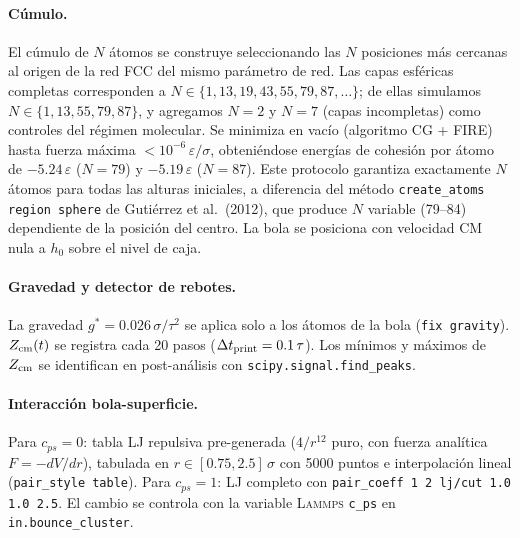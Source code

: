 \documentclass[aps,pre,twocolumn,reprint,superscriptaddress]{revtex4-2}
\newcommand{\eps}{\varepsilon}
\newcommand{\gstar}{g^*}
\newcommand{\lammps}{\textsc{Lammps}}
\begin{document}
\paragraph{Cúmulo.}
El cúmulo de $N$ átomos se construye seleccionando las $N$ posiciones más
cercanas al origen de la red FCC del mismo parámetro de red. Las capas
esféricas completas corresponden a $N\in\{1,13,19,43,55,79,87,\ldots\}$;
de ellas simulamos $N\in\{1,13,55,79,87\}$, y agregamos $N=2$ y $N=7$
(capas incompletas) como controles del régimen molecular.
Se minimiza en vacío (algoritmo CG + FIRE) hasta fuerza máxima
$<10^{-6}\,\eps/\sigma$, obteniéndose energías de cohesión por átomo de
$-5.24\,\eps$ ($N=79$) y $-5.19\,\eps$ ($N=87$). Este protocolo garantiza
exactamente $N$ átomos para todas las alturas iniciales, a diferencia del
método \texttt{create\_atoms region sphere} de Gutiérrez et al.\ (2012),
que produce $N$ variable (79--84) dependiente de la posición del centro.
La bola se posiciona con velocidad CM nula a $h_0$ sobre el nivel de caja.

\paragraph{Gravedad y detector de rebotes.}
La gravedad $\gstar=0.026\,\sigma/\tau^2$ se aplica solo a los átomos de la
bola (\texttt{fix gravity}). $Z_{\rm cm}(t)$ se registra cada 20 pasos
($\Delta t_{\rm print}=0.1\,\tau$). Los mínimos y máximos de $Z_{\rm cm}$
se identifican en post-análisis con \texttt{scipy.signal.find\_peaks}.

\paragraph{Interacción bola-superficie.}
Para $c_{ps}=0$: tabla LJ repulsiva pre-generada ($4/r^{12}$ puro, con
fuerza analítica $F=-dV/dr$), tabulada en $r\in[0.75,2.5]\,\sigma$ con
5000 puntos e interpolación lineal (\texttt{pair\_style table}).
Para $c_{ps}=1$: LJ completo con \texttt{pair\_coeff 1 2 lj/cut 1.0 1.0 2.5}.
El cambio se controla con la variable \lammps{} \texttt{c\_ps} en
\texttt{in.bounce\_cluster}.
\end{document}
